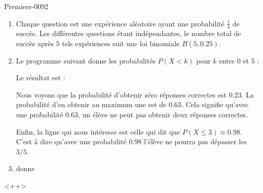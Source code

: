 
\begin{corrige}{Premiere-0092}

    \begin{enumerate}
        \item
            Chaque question est une expérience aléatoire ayant une probabilité \( \frac{1}{ 4 }\) de succès. Les différentes questions étant indépendantes, le nombre total de succès après \( 5\) tels expériences suit une loi binomiale \( B(5,0.25)\).
        \item
            Le programme suivant donne les probabilités \( P(X<k)\) pour \( k\) entre \( 0\) et \( 5\) :

Le résultat est :

            Nous voyons que la probabilité d'obtenir zéro réponses correctes est \( 0.23\). La probabilité d'en obtenir au maximum une est de \( 0.63\). Cela signifie qu'avec une probabilité \( 0.63\), un élève ne peut pas obtenir deux réponses correctes.

            Enfin, la ligne qui nous intéresse est celle qui dit que \( P(X\leq 3)\approx 0.98\). C'est à dire qu'avec une probabilité \( 0.98\) l'élève ne pourra pas dépasser les \( 3/5\).

        \item

donne


    \end{enumerate}
    <++>

\end{corrige}
